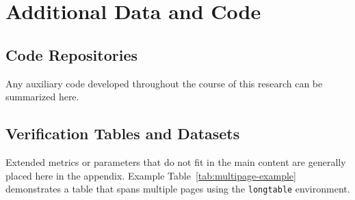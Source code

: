 \chapter{Additional Data and Code}
\label{chap:appendix_a}

\section{Code Repositories}
Any auxiliary code developed throughout the course of this research can be summarized here.

\section{Verification Tables and Datasets}
Extended metrics or parameters that do not fit in the main content are generally placed here in the appendix. Example Table~\ref{tab:multipage-example} demonstrates a table that spans multiple pages using the \texttt{longtable} environment.


